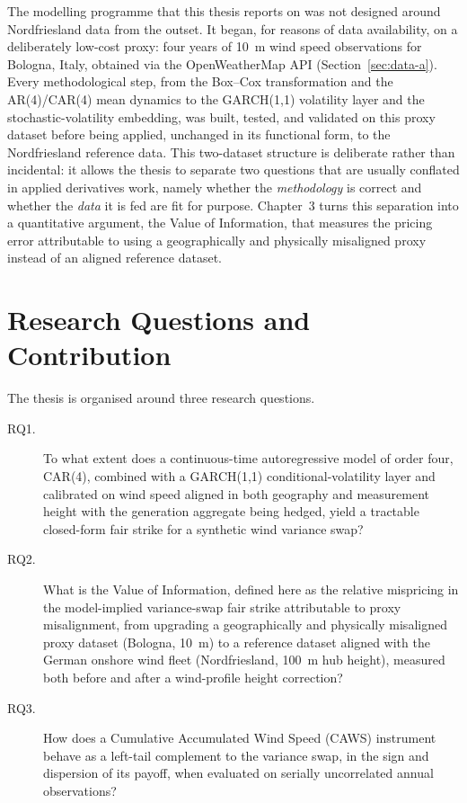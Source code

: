 \documentclass[11pt, a4paper, twoside]{article}
\begin{document}
The modelling programme that this thesis reports on was not designed around Nordfriesland data from the outset. It began, for reasons of data availability, on a deliberately low-cost proxy: four years of 10~m wind speed observations for Bologna, Italy, obtained via the OpenWeatherMap API (Section~\ref{sec:data-a}). Every methodological step, from the Box--Cox transformation and the AR(4)/CAR(4) mean dynamics to the GARCH(1,1) volatility layer and the stochastic-volatility embedding, was built, tested, and validated on this proxy dataset before being applied, unchanged in its functional form, to the Nordfriesland reference data. This two-dataset structure is deliberate rather than incidental: it allows the thesis to separate two questions that are usually conflated in applied derivatives work, namely whether the \emph{methodology} is correct and whether the \emph{data} it is fed are fit for purpose. Chapter~3 turns this separation into a quantitative argument, the Value of Information, that measures the pricing error attributable to using a geographically and physically misaligned proxy instead of an aligned reference dataset.

\section{Research Questions and Contribution}
\label{sec:rqs}

The thesis is organised around three research questions.

\begin{description}
\item[RQ1.] To what extent does a continuous-time autoregressive model of order four, CAR(4), combined with a GARCH(1,1) conditional-volatility layer and calibrated on wind speed aligned in both geography and measurement height with the generation aggregate being hedged, yield a tractable closed-form fair strike for a synthetic wind variance swap?
\item[RQ2.] What is the Value of Information, defined here as the relative mispricing in the model-implied variance-swap fair strike attributable to proxy misalignment, from upgrading a geographically and physically misaligned proxy dataset (Bologna, 10~m) to a reference dataset aligned with the German onshore wind fleet (Nordfriesland, 100~m hub height), measured both before and after a wind-profile height correction?
\item[RQ3.] How does a Cumulative Accumulated Wind Speed (CAWS) instrument behave as a left-tail complement to the variance swap, in the sign and dispersion of its payoff, when evaluated on serially uncorrelated annual observations?
\end{description}
\end{document}

